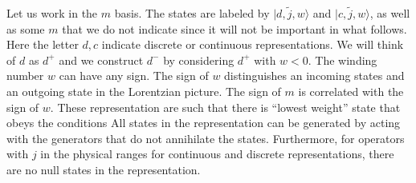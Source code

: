 Let us work in the $m$ basis. The states are labeled by
$|d,\tilde j , w \rangle$
and $|c,\tilde j , w \rangle$,  as well as
some $m$ that we do not indicate since it
will not be important in what follows. Here the letter $d,c$ indicate
discrete or continuous representations. We will think of $d$ as $d^+$ and
we construct $d^-$ by considering $d^+$ with $w<0$. The winding
number $w$ can have any sign.
The sign of $w$ distinguishes
an incoming states and an outgoing state
 in the Lorentzian picture. The sign of
$m$ is correlated with the sign of $w$.
These representation are such that there is ``lowest weight'' state that
obeys the conditions
\eqn{}
All states in the representation can be generated by acting with the
generators that do not annihilate the states. Furthermore, for operators
with $j$ in the physical ranges for continuous and discrete representations,
there are no null states in the representation.


